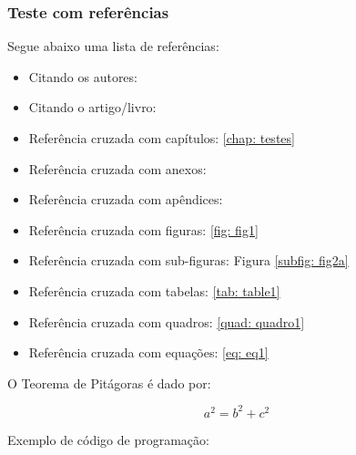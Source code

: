 \subsubsection{Teste com referências}

Segue abaixo uma lista de referências:

\begin{itemize}%
  \item Citando os autores: 
  \item Citando o artigo/livro: \cite{Goodfellow2016}
  \item Referência cruzada com capítulos: \autoref{chap: testes}
  \item Referência cruzada com anexos: 
  \item Referência cruzada com apêndices: 
  \item Referência cruzada com figuras: \autoref{fig: fig1}
  \item Referência cruzada com sub-figuras: Figura \ref{subfig: fig2a}
  \item Referência cruzada com tabelas: \autoref{tab: table1}
  \item Referência cruzada com quadros: \autoref{quad: quadro1}
  \item Referência cruzada com equações: \autoref{eq: eq1}
\end{itemize}
    

O Teorema de Pitágoras é dado por:

\begin{equation}
    \label{eq: eq1}
	a^{2}= b^{2}+c^{2}
\end{equation}

Exemplo de código de programação:
  
